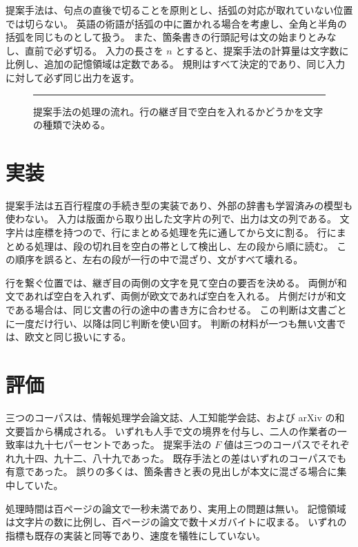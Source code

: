\documentclass[11pt,a4paper]{article}
\newcommand{\s}[1]{#1}
\begin{document}
\s{提案手法は、句点の直後で切ることを原則とし、括弧の対応が取れていない位置では切らない。}%
\s{英語の術語が括弧の中に置かれる場合を考慮し、全角と半角の括弧を同じものとして扱う。}%
\s{また、箇条書きの行頭記号は文の始まりとみなし、直前で必ず切る。}%
\s{入力の長さを $n$ とすると、提案手法の計算量は文字数に比例し、追加の記憶領域は定数である。}%
\s{規則はすべて決定的であり、同じ入力に対して必ず同じ出力を返す。}%

\begin{figure}[t]
  \centering
  \rule{6cm}{2.4cm}
  \caption{提案手法の処理の流れ。行の継ぎ目で空白を入れるかどうかを文字の種類で決める。}
\end{figure}

\section{実装}

\s{提案手法は五百行程度の手続き型の実装であり、外部の辞書も学習済みの模型も使わない。}%
\s{入力は版面から取り出した文字片の列で、出力は文の列である。}%
\s{文字片は座標を持つので、行にまとめる処理を先に通してから文に割る。}%
\s{行にまとめる処理は、段の切れ目を空白の帯として検出し、左の段から順に読む。}%
\s{この順序を誤ると、左右の段が一行の中で混ざり、文がすべて壊れる。}%

\s{行を繋ぐ位置では、継ぎ目の両側の文字を見て空白の要否を決める。}%
\s{両側が和文であれば空白を入れず、両側が欧文であれば空白を入れる。}%
\s{片側だけが和文である場合は、同じ文書の行の途中の書き方に合わせる。}%
\s{この判断は文書ごとに一度だけ行い、以降は同じ判断を使い回す。}%
\s{判断の材料が一つも無い文書では、欧文と同じ扱いにする。}%

\section{評価}

\s{三つのコーパスは、情報処理学会論文誌、人工知能学会誌、および arXiv の和文要旨から構成される。}%
\s{いずれも人手で文の境界を付与し、二人の作業者の一致率は九十七パーセントであった。}%
\s{提案手法の $F$ 値は三つのコーパスでそれぞれ九十四、九十二、八十九であった。}%
\s{既存手法との差はいずれのコーパスでも有意であった。}%
\s{誤りの多くは、箇条書きと表の見出しが本文に混ざる場合に集中していた。}%

\s{処理時間は百ページの論文で一秒未満であり、実用上の問題は無い。}%
\s{記憶領域は文字片の数に比例し、百ページの論文で数十メガバイトに収まる。}%
\s{いずれの指標も既存の実装と同等であり、速度を犠牲にしていない。}%
\end{document}
